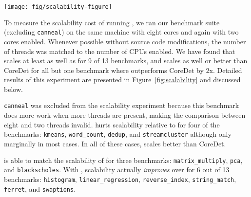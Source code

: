 \label{sec:scalability}

\begin{figure*}
{\centering
\texttt{[image: fig/scalability-figure]}
\caption{Speedup of eight cores versus two cores (higher is better).  When possible to control with command line options, the number of threads was matched to the number of cores enabled.\label{fig:scalability}}
}
\end{figure*}

To measure the scalability cost of running \dthreads{}, we ran our benchmark suite (excluding \texttt{canneal}) on the same machine with eight cores and again with two cores enabled.  Whenever possible without source code modifications, the number of threads was matched to the number of CPUs enabled.  We have found that \dthreads{} scales at least as well as \pthreads{} for 9 of 13 benchmarks, and scales as well or better than CoreDet for all but one benchmark where \dthreads{} outperforms CoreDet by 2x.  Detailed results of this experiment are presented in Figure~\ref{fig:scalability} and discussed below.

\texttt{canneal} was excluded from the scalability experiment because this benchmark does more work when more threads are present, making the comparison between eight and two threads invalid.  \dthreads{} hurts scalability relative to \pthreads{} for four of the benchmarks: \texttt{kmeans}, \texttt{word\_count}, \texttt{dedup}, and \texttt{streamcluster} although only marginally in most cases.  In all of these cases, \dthreads{} scales better than CoreDet.

\dthreads{} is able to match the scalability of \pthreads{} for three benchmarks: \texttt{matrix\_multiply}, \texttt{pca}, and \texttt{blackscholes}.  With \dthreads{}, scalability actually \emph{improves} over \pthreads{} for 6 out of 13 benchmarks: \texttt{histogram}, \texttt{linear\_regression}, \texttt{reverse\_index}, \texttt{string\_match}, \texttt{ferret}, and \texttt{swaptions}.

